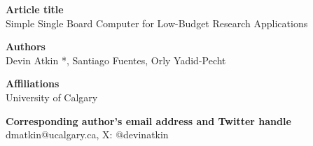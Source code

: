 \textbf{Article title}\\ 
Simple Single Board Computer for Low-Budget Research Applications

\textbf{Authors}\\ 
Devin Atkin *, Santiago Fuentes, Orly Yadid-Pecht

\textbf{Affiliations}\\ 
University of Calgary

\textbf{Corresponding author’s email address and Twitter handle}\\ 
dmatkin@ucalgary.ca, X: @devinatkin
